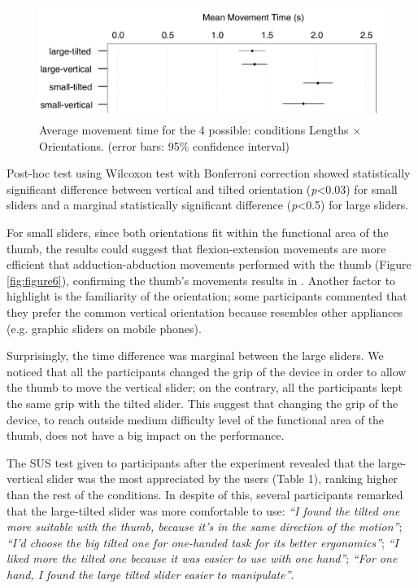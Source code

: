\documentclass{sigchi}
\begin{document}
\begin{figure}[h]
\centering
  \includegraphics[width=1\columnwidth]{figures/movementTime}
  \caption{Average movement time for the 4 possible: conditions Lengths $\times$ Orientations. (error bars: 95\% confidence interval)}
  \label{fig:figure5}
\end{figure}

Post-hoc test using Wilcoxon test with Bonferroni correction showed statistically significant difference between vertical and tilted orientation (\textit{p}<0.03) for small sliders and a marginal statistically significant difference (\textit{p}<0.5) for large sliders.

For small sliders, since both orientations fit within the functional area of the thumb, the results could suggest that flexion-extension movements are more efficient that adduction-abduction movements performed with the thumb (Figure \ref{fig:figure6}), confirming the thumb’s movements results in \cite{Karlson06understandingsingle-handed}. Another factor to highlight is the familiarity of the orientation; some participants commented that they prefer the common vertical orientation because resembles other appliances (e.g. graphic sliders on mobile phones).

Surprisingly, the time difference was marginal between the large sliders. We noticed that all the participants changed the grip of the device in order to allow the thumb to move the vertical slider; on the contrary, all the participants kept the same grip with the tilted slider. This suggest that changing the grip of the device, to reach outside medium difficulty level of the functional area of the thumb, does not have a big impact on the performance.

The SUS test given to participants after the experiment revealed that the large-vertical slider was the most appreciated by the users (Table 1), ranking higher than the rest of the conditions. In despite of this, several participants remarked that the large-tilted slider was more comfortable to use: \textit{“I found the tilted one more suitable with the thumb, because it's in the same direction of the motion”}; \textit{“I’d choose the big tilted one for one-handed task for its better ergonomics”}; \textit{“I liked more the tilted one because it was easier to use with one hand”}; \textit{“For one hand, I found  the large tilted slider easier to manipulate”}.
\end{document}
